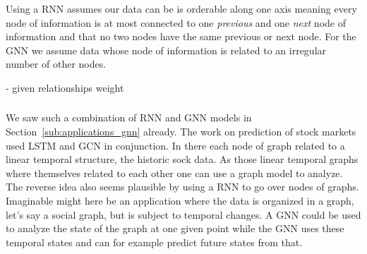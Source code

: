 \documentclass{article}
\begin{document}
\subsubsection{}
Using a RNN assumes our data can be is orderable along one axis meaning every node of information is at most connected to one \textit{previous} and one \textit{next} node of information and that no two nodes have the same previous or next node.
For the GNN we assume data whose node of information is related to an irregular number of other nodes.

- given relationships weight

\subsubsection{}
We saw such a combination of RNN and GNN models in Section~\ref{sub:applications_gnn} already. The work on prediction of stock markets used LSTM and GCN in conjunction.
In there each node of graph related to a linear temporal structure, the historic sock data.
As those linear temporal graphs where themselves related to each other one can use a graph model to analyze.
The reverse idea also seems plausible by using a RNN to go over nodes of graphs.
Imaginable might here be an application where the data is organized in a graph, let's say a social graph, but is subject to temporal changes.
A GNN could be used to analyze the state of the graph at one given point while the GNN uses these temporal states and can for example predict future states from that.



\end{document}
